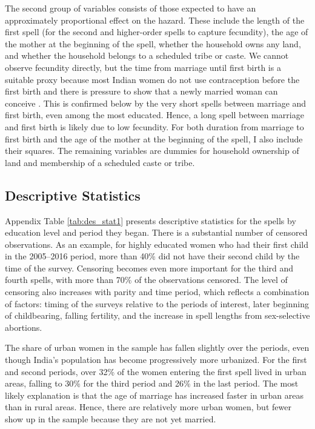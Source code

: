 \documentclass[12pt,letterpaper]{article}
\begin{document}
The second group of variables consists of those expected to have an 
approximately proportional effect on the hazard.
These include the length of the first spell 
(for the second and higher-order spells to capture fecundity), 
the age of the mother at the beginning of the spell, 
whether the household owns any land, 
and whether the household belongs to a scheduled tribe or caste.
We cannot observe fecundity directly, but the time from marriage until 
first birth is a suitable proxy because most Indian women do not use 
contraception before the first birth and there is pressure to show that 
a newly married woman can conceive \citep{dyson83,Sethuraman2007,Dommaraju2009}.
This is confirmed below by the very short spells between marriage and first birth,
even among the most educated.
Hence, a long spell between marriage and first birth is likely due to low fecundity.
For both duration from marriage to first birth and the age of the mother at the 
beginning of the spell, I also include their squares.
The remaining variables are dummies for household ownership of land and membership
of a scheduled caste or tribe.


\subsection{Descriptive Statistics}

Appendix Table \ref{tab:des_stat1} presents descriptive statistics for
the spells by education level and period they began.
There is a substantial number of censored observations.
As an example, for highly educated women who had their first child in the 2005--2016
period, more than 40\% did not have their second child by the time of the survey.
Censoring becomes even more important for the third and fourth
spells, with more than 70\% of the observations censored.
The level of censoring also increases with parity and time period,
which reflects a combination of factors: timing of the surveys
relative to the periods of interest, later beginning of childbearing, 
falling fertility, and the increase in spell lengths from 
sex-selective abortions.

The share of urban women in the sample has fallen slightly over the
periods, even though India's population has become progressively more urbanized.
For the first and second periods, over 32\% of the women 
entering the first spell lived in urban areas, falling to 
30\% for the third period and 26\% in the last period.
The most likely explanation is that the age of marriage has increased
faster in urban areas than in rural areas.
Hence, there are relatively more urban women, but fewer show up in the
sample because they are not yet married.
\end{document}
